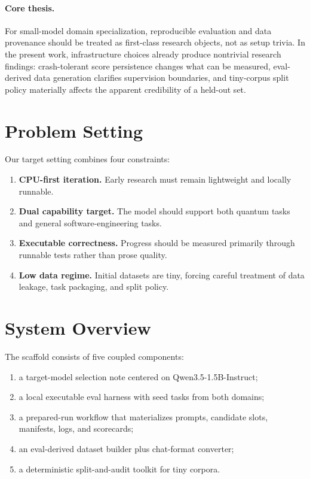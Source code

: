 \documentclass[11pt]{article}
\begin{document}
\paragraph{Core thesis.}
For small-model domain specialization, reproducible evaluation and data provenance should be treated as first-class research objects, not as setup trivia. In the present work, infrastructure choices already produce nontrivial research findings: crash-tolerant score persistence changes what can be measured, eval-derived data generation clarifies supervision boundaries, and tiny-corpus split policy materially affects the apparent credibility of a held-out set.

\section{Problem Setting}
Our target setting combines four constraints:
\begin{enumerate}[leftmargin=1.5em]
    \item \textbf{CPU-first iteration.} Early research must remain lightweight and locally runnable.
    \item \textbf{Dual capability target.} The model should support both quantum tasks and general software-engineering tasks.
    \item \textbf{Executable correctness.} Progress should be measured primarily through runnable tests rather than prose quality.
    \item \textbf{Low data regime.} Initial datasets are tiny, forcing careful treatment of data leakage, task packaging, and split policy.
\end{enumerate}

\section{System Overview}
The scaffold consists of five coupled components:
\begin{enumerate}[leftmargin=1.5em]
    \item a target-model selection note centered on Qwen3.5-1.5B-Instruct;
    \item a local executable eval harness with seed tasks from both domains;
    \item a prepared-run workflow that materializes prompts, candidate slots, manifests, logs, and scorecards;
    \item an eval-derived dataset builder plus chat-format converter;
    \item a deterministic split-and-audit toolkit for tiny corpora.
\end{enumerate}
\end{document}

